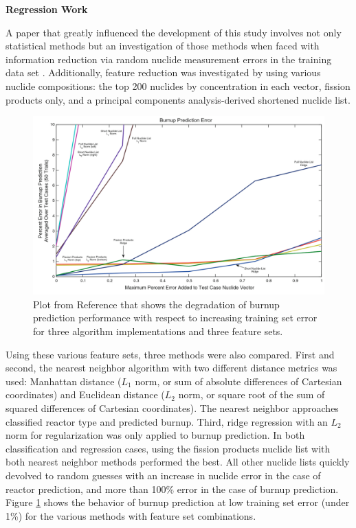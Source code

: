 \noindent \textbf{Regression Work}

A paper that greatly influenced the development of this study involves not only
statistical methods but an investigation of those methods when faced with
information reduction via random nuclide measurement errors in the training
data set \cite{dayman_feasibility_2013}.  Additionally, feature reduction was
investigated by using various nuclide compositions: the top 200 nuclides by
concentration in each vector, fission products only, and a principal components
analysis-derived shortened nuclide list.  

\begin{figure}[!htb]
  \centering
  \includegraphics[width=\linewidth]{./chapters/litrev/dayman.png}
  \caption[Burnup performance with respect to training set error]
          {Plot from Reference \cite{dayman_feasibility_2013} that shows the 
           degradation of burnup prediction performance with respect to 
           increasing training set error for three algorithm implementations 
           and three feature sets.}
  \label{fig:dayman}
\end{figure}

Using these various feature sets, three methods were also compared. First and
second, the nearest neighbor algorithm with two different distance metrics was
used: Manhattan distance ($L_1$ norm, or sum of absolute differences of
Cartesian coordinates) and Euclidean distance ($L_2$ norm, or square root of
the sum of squared differences of Cartesian coordinates).  The nearest neighbor
approaches classified reactor type and predicted burnup.  Third, ridge
regression with an $L_2$ norm for regularization was only applied to burnup
prediction.  In both classification and regression cases, using the fission
products nuclide list with both nearest neighbor methods performed the best.
All other nuclide lists quickly devolved to random guesses with an increase in
nuclide error in the case of reactor prediction, and more than 100\% error in
the case of burnup prediction. Figure \ref{fig:dayman} shows the behavior of
burnup prediction at low training set error (under 1\%) for the various methods
with feature set combinations. 

